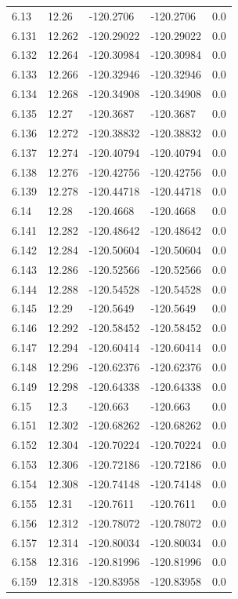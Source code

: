 \begin{tabular}{lllll}
6.13 & 12.26 & -120.2706 & -120.2706 & 0.0 \\
6.131 & 12.262 & -120.29022 & -120.29022 & 0.0 \\
6.132 & 12.264 & -120.30984 & -120.30984 & 0.0 \\
6.133 & 12.266 & -120.32946 & -120.32946 & 0.0 \\
6.134 & 12.268 & -120.34908 & -120.34908 & 0.0 \\
6.135 & 12.27 & -120.3687 & -120.3687 & 0.0 \\
6.136 & 12.272 & -120.38832 & -120.38832 & 0.0 \\
6.137 & 12.274 & -120.40794 & -120.40794 & 0.0 \\
6.138 & 12.276 & -120.42756 & -120.42756 & 0.0 \\
6.139 & 12.278 & -120.44718 & -120.44718 & 0.0 \\
6.14 & 12.28 & -120.4668 & -120.4668 & 0.0 \\
6.141 & 12.282 & -120.48642 & -120.48642 & 0.0 \\
6.142 & 12.284 & -120.50604 & -120.50604 & 0.0 \\
6.143 & 12.286 & -120.52566 & -120.52566 & 0.0 \\
6.144 & 12.288 & -120.54528 & -120.54528 & 0.0 \\
6.145 & 12.29 & -120.5649 & -120.5649 & 0.0 \\
6.146 & 12.292 & -120.58452 & -120.58452 & 0.0 \\
6.147 & 12.294 & -120.60414 & -120.60414 & 0.0 \\
6.148 & 12.296 & -120.62376 & -120.62376 & 0.0 \\
6.149 & 12.298 & -120.64338 & -120.64338 & 0.0 \\
6.15 & 12.3 & -120.663 & -120.663 & 0.0 \\
6.151 & 12.302 & -120.68262 & -120.68262 & 0.0 \\
6.152 & 12.304 & -120.70224 & -120.70224 & 0.0 \\
6.153 & 12.306 & -120.72186 & -120.72186 & 0.0 \\
6.154 & 12.308 & -120.74148 & -120.74148 & 0.0 \\
6.155 & 12.31 & -120.7611 & -120.7611 & 0.0 \\
6.156 & 12.312 & -120.78072 & -120.78072 & 0.0 \\
6.157 & 12.314 & -120.80034 & -120.80034 & 0.0 \\
6.158 & 12.316 & -120.81996 & -120.81996 & 0.0 \\
6.159 & 12.318 & -120.83958 & -120.83958 & 0.0 \\

\end{tabular}
